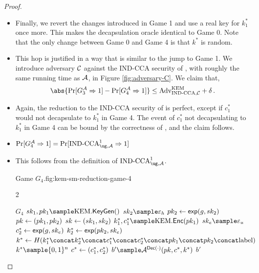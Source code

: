 \begin{proof}
    \begin{itemize}
    \item[\textbf{Game 4}]
        Finally, we revert the changes introduced in Game 1 and use a real
        key for $k_1^*$ once more.
        This makes the decapsulation oracle identical to Game 0. Note that the only change between Game 0 and Game 4 is that $k^*$ is random.
    \item[\emph{Claim 4}]
        This hop is justified in a way that is similar to the jump to Game 1.
        We introduce adversary $\mathcal{C}$ against the IND-CCA security
        of \kem, with roughly the same running time as $\mathcal{A}$, in
        Figure \ref{fig:adversary-C}.
        We claim that,
        \[
            \abs{\prone{G^{\adversary{A}}_3} - \prone{G^{\adversary{A}}_4}} \leq \advantage{\cca, \adversary{C}}{\kem} + \delta \, .
        \]
    \item[\emph{Proof}]
        Again, the reduction to the IND-CCA security of \kem is perfect,
        except if $c_1^*$ would not decapsulate to $k_1^*$ in Game 4. The
        event of $c_1^*$ not decapsulating to $k_1^*$ in Game 4 can be bound
        by the correctness of \kem, and the claim follows.
    \item[\emph{Claim 5}]
        $\prone{G^{\adversary{A}}_4} = \prone{\cca^1_{\ug, \adversary{A}}}$
    \item[\emph{Proof}]
        This follows from the definition of $\cca^1_{\ug, \adversary{A}}$.
        \begin{gamefigure}{Game $G_4$.}{fig:kem-sm-reduction-game-4}
            \begin{games}{2}
                \begin{gameenv}{\game $G_4$}
                    \State $\sk_1, \pk_1 \sample \kem.\keygen()$
                    \State $\sk_2 \sample \honestexponent$
                    \State $pk_2 \leftarrow \textsf{exp}(g, sk_2)$
                    \State $pk \leftarrow (pk_1, pk_2)$
                    \State $sk \leftarrow (sk_1, sk_2)$
                    \State $k^*_1, c^*_1 \sample \kem.\enc(\pk_1)$
                    \State $\sk_e \sample \exponent$
                    \State $c^*_2 \leftarrow \textsf{exp}(g, sk_e)$
                    \State $k^*_2 \leftarrow \textsf{exp}(pk_2, sk_e)$
                    \State $k^* \assign H(\hashinputchallenges)$
                    \State  $k^* \sample \bits^{n}$
                    \State $c^* \leftarrow (c_1^*, c_2^*)$
                    \State $b' \sample \adversary{A}^{\dec(\cdot)}(\pk, c^*, k^*)$
                    \State \Return $b'$
                \end{gameenv}


\end{games}
\end{gamefigure}
\end{itemize}
\end{proof}
